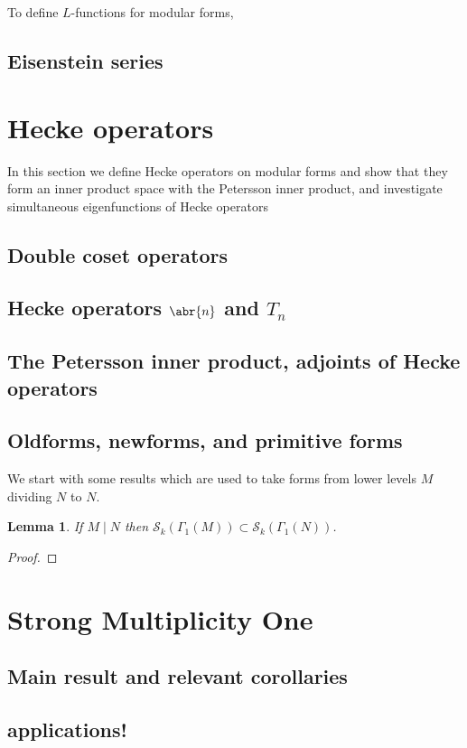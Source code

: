 \documentclass[10pt,leqno,twoside]{article}
\theoremstyle{plain}
\newtheorem{lemma}[lem]{Lemma}
\theoremstyle{definition}
\numberwithin{equation}{section}
\numberwithin{lem}{section}
\newcommand{\textib}[1]{\textbf{\textit{#1\index{#1}}}} %
\newcommand{\tbd}{{\Huge\color{red}{\textib{TBD}}}}
\begin{document}
To define $L$-functions for modular forms, 

\subsection{Eisenstein series}

\newpage\section{Hecke operators}
In this section we define Hecke operators on modular forms and show that they form an inner product space with the Petersson inner product, and investigate simultaneous eigenfunctions of Hecke operators \tbd
\subsection{Double coset operators}

\subsection{Hecke operators $\abr{n}$ and $T_n$}
\subsection{The Petersson inner product, adjoints of Hecke operators}
\subsection{Oldforms, newforms, and primitive forms}
We start with some results which are used to take forms from lower levels $M$ dividing $N$ to $N$.
\begin{lemma}
    If $M\mid N$ then $\mathcal S_k(\varGamma_1(M))\subset \mathcal S_k(\varGamma_1(N))$.
\end{lemma}
\begin{proof}
    \tbd
\end{proof}


\newpage\section{Strong Multiplicity One}
\subsection{Main result and relevant corollaries}
\subsection{applications!}
\end{document}
